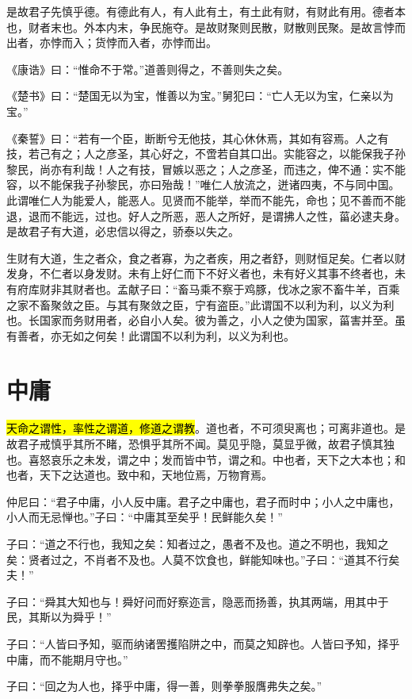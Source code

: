 是故君子先慎乎德。有德此有人，有人此有土，有土此有财，有财此有用。德者本也，财者末也。外本内末，争民施夺。是故财聚则民散，财散则民聚。是故言悖而出者，亦悖而入；货悖而入者，亦悖而出。

《康诰》曰：“惟命不于常。”道善则得之，不善则失之矣。

《楚书》曰：“楚国无以为宝，惟善以为宝。”舅犯曰：“亡人无以为宝，仁亲以为宝。”

《秦誓》曰：“若有一个臣，断断兮无他技，其心休休焉，其如有容焉。人之有技，若己有之；人之彦圣，其心好之，不啻若自其口出。实能容之，以能保我子孙黎民，尚亦有利哉！人之有技，冒嫉以恶之；人之彦圣，而违之，俾不通：实不能容，以不能保我子孙黎民，亦曰殆哉！”唯仁人放流之，迸诸四夷，不与同中国。此谓唯仁人为能爱人，能恶人。见贤而不能举，举而不能先，命也；见不善而不能退，退而不能远，过也。好人之所恶，恶人之所好，是谓拂人之性，菑必逮夫身。是故君子有大道，必忠信以得之，骄泰以失之。

生财有大道，生之者众，食之者寡，为之者疾，用之者舒，则财恒足矣。仁者以财发身，不仁者以身发财。未有上好仁而下不好义者也，未有好义其事不终者也，未有府库财非其财者也。孟献子曰：“畜马乘不察于鸡豚，伐冰之家不畜牛羊，百乘之家不畜聚敛之臣。与其有聚敛之臣，宁有盗臣。”此谓国不以利为利，以义为利也。长国家而务财用者，必自小人矣。彼为善之，小人之使为国家，菑害并至。虽有善者，亦无如之何矣！此谓国不以利为利，以义为利也。

\section{中庸}

\hl{天命之谓性，率性之谓道，修道之谓教}。道也者，不可须臾离也；可离非道也。是故君子戒慎乎其所不睹，恐惧乎其所不闻。莫见乎隐，莫显乎微，故君子慎其独也。喜怒哀乐之未发，谓之中；发而皆中节，谓之和。中也者，天下之大本也；和也者，天下之达道也。致中和，天地位焉，万物育焉。

仲尼曰：“君子中庸，小人反中庸。君子之中庸也，君子而时中；小人之中庸也，小人而无忌惮也。”子曰：“中庸其至矣乎！民鲜能久矣！”

子曰：“道之不行也，我知之矣：知者过之，愚者不及也。道之不明也，我知之矣：贤者过之，不肖者不及也。人莫不饮食也，鲜能知味也。”子曰：“道其不行矣夫！”

子曰：“舜其大知也与！舜好问而好察迩言，隐恶而扬善，执其两端，用其中于民，其斯以为舜乎！”

子曰：“人皆曰予知，驱而纳诸罟擭陷阱之中，而莫之知辟也。人皆曰予知，择乎中庸，而不能期月守也。”

子曰：“回之为人也，择乎中庸，得一善，则拳拳服膺弗失之矣。”

